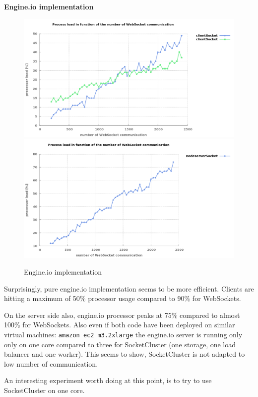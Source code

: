 \textbf{Engine.io implementation}
\begin{figure}[H]
	\centering
		\includegraphics[width=\textwidth]{./Figures/engine_client_comparaison.png}
		\includegraphics[width=\textwidth]{./Figures/engine_server_comparaison.png}
	\caption[Engine.io implementation]{Engine.io implementation}
	\label{fig:engine_comparaison}
\end{figure}

Surprisingly, pure engine.io implementation seems to be more efficient. Clients
are hitting a maximum of 50\% processor usage compared to 90\% for WebSockets.

On the server side also, engine.io processor peaks at 75\% compared to almost
100\% for WebSockets. Also even if both code have been deployed on similar
virtual machines: \texttt{amazon ec2 m3.2xlarge} the engine.io server is
running only only on one core compared to three for SocketCluster (one storage,
one load balancer and one worker). This seems to show, SocketCluster is not
adapted to low number of communication.

An interesting experiment worth doing at this point, is to try to use
SocketCluster on one core.

